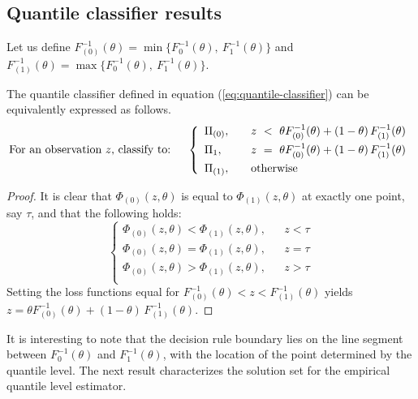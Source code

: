 \subsection{Quantile classifier results}
\label{sec:quantile-classifier-results}

Let us define
$F_{(0)}^{-1}(\theta) = \min\Big\{ F_0^{-1}(\theta),~ F_1^{-1}(\theta) \Big\}$
and
$F_{(1)}^{-1}(\theta) = \max\Big\{ F_0^{-1}(\theta),~ F_1^{-1}(\theta) \Big\}$.

\begin{lemma}
  \label{lem:decision-boundary}
  The quantile classifier defined in equation (\ref{eq:quantile-classifier}) can
  be equivalently expressed as follows.
  \begin{equation}
    \label{eq:alt-quantile-classifier}
    \text{For an observation $z$, classify to:} \hspace{5mm} \left\{ 
      \begin{array}{lcl}
        \Pi_{(0)}, & & z ~<~ \theta F_{(0)}^{-1}(\theta) +
                       (1 - \theta)\, F_{(1)}^{-1}(\theta) \\[1ex]
        \Pi_{1}, & & z ~=~ \theta F_{(0)}^{-1}(\theta) +
                       (1 - \theta)\, F_{(1)}^{-1}(\theta) \\[1ex]
        \Pi_{(1)}, & & \textup{otherwise}
      \end{array}
    \right.
  \end{equation}
\end{lemma}

\begin{proof}
  It is clear that $\Phi_{(0)}(z, \theta)$ is equal to $\Phi_{(1)}(z, \theta)$
  at exactly one point, say $\tau$, and that the following holds:
  \begin{equation*}
    \left\{
      \begin{array}{lll}
        \Phi_{(0)}(z, \theta) < \Phi_{(1)}(z, \theta), & & z < \tau \\[1ex]
        \Phi_{(0)}(z, \theta) = \Phi_{(1)}(z, \theta), & & z = \tau \\[1ex]
        \Phi_{(0)}(z, \theta) > \Phi_{(1)}(z, \theta), & & z > \tau \\
      \end{array}
    \right.
  \end{equation*}
  Setting the loss functions equal for
  $F_{(0)}^{-1}(\theta) < z < F_{(1)}^{-1}(\theta)$ yields
  $z = \theta F_{(0)}^{-1}(\theta) + (1 - \theta)\, F_{(1)}^{-1}(\theta)$.
\end{proof}
It is interesting to note that the decision rule boundary lies on the line
segment between $F_0^{-1}(\theta)$ and $F_1^{-1}(\theta)$, with the location of
the point determined by the quantile level.  The next result characterizes the
solution set for the empirical quantile level estimator.

